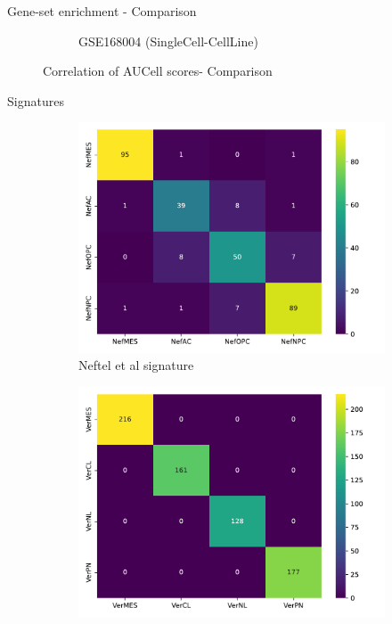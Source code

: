 \documentclass[aspectratio=169,9pt]{beamer}
\begin{document}
\begin{frame}{Gene-set enrichment - Comparison}
\begin{adjustwidth}{-5cm}{-5cm}
\begin{figure}
\begin{subfigure}[c]{0.48\textwidth}
                    \caption{GSE168004 (SingleCell-CellLine)}
                \end{subfigure}
                \caption{Correlation of AUCell scores- Comparison}
            \end{figure}
        \end{adjustwidth}
    \end{frame}
    
    \begin{frame}{Signatures}
        \begin{adjustwidth}{-5cm}{-5cm}
            \centering
            \begin{figure}
                \centering
                \begin{subfigure}[c]{0.38\textwidth}
                    \centering
                    \includegraphics[width=\textwidth]{signature_overlap_Nef}
                    \caption{Neftel et al signature}
                \end{subfigure}
                \pause
                \begin{subfigure}[c]{0.38\textwidth}
                    \centering
                    \includegraphics[width=\textwidth]{signature_overlap_Ver}

\end{subfigure}
\end{figure}
\end{adjustwidth}
\end{frame}
\end{document}
